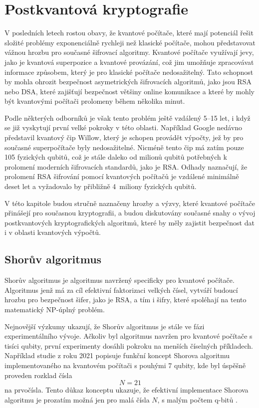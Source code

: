 \section{Postkvantová kryptografie}
\label{sec:postkvantova-kryptografie}
V posledních letech rostou obavy, že kvantové počítače, které mají potenciál řešit složité problémy exponenciálně rychleji než klasické počítače, mohou představovat vážnou hrozbu pro současné šifrovací algoritmy. Kvantové počítače využívají jevy, jako je kvantová superpozice a kvantové provázání, což jim umožňuje zpracovávat informace způsobem, který je pro klasické počítače nedosažitelný. Tato schopnost by mohla ohrozit bezpečnost asymetrických šifrovacích algoritmů, jako jsou RSA nebo DSA, které zajišťují bezpečnost většiny online komunikace a které by mohly být kvantovými počítači prolomeny během několika minut\mbox{\parencite{qubits2024}.}

Podle některých odborníků je však tento problém ještě vzdálený 5--15 let, i když se již vyskytují první velké pokroky v této oblasti. Například Google nedávno představil kvantový čip Willow, který je schopen provádět výpočty, jež by pro současné superpočítače byly nedosažitelné. Nicméně tento čip má zatím pouze 105 fyzických qubitů, což je stále daleko od milionů qubitů potřebných k prolomení moderních šifrovacích standardů, jako je RSA. Odhady naznačují, že prolomení RSA šifrování pomocí kvantových počítačů je vzdálené minimálně deset let a vyžadovalo by přibližně 4~miliony fyzických qubitů\parencite{qubits2024}.

V této kapitole budou stručně naznačeny hrozby a výzvy, které kvantové počítače přinášejí pro současnou kryptografii, a budou diskutovány současné snahy o vývoj postkvantových kryptografických algoritmů, které by měly zajistit bezpečnost dat i v oblasti kvantových výpočtů.

\subsection{Shorův algoritmus}
Shorův algoritmus je algoritmus navržený specificky pro kvantové počítače. Algoritmus jenž má za cíl efektivní faktorizaci velkých čísel, vytváří budoucí hrozbu pro bezpečnost šifer, jako je RSA, a tím i šifry, které spoléhají na tento matematický NP-úplný problém.

Nejnovější výzkumy ukazují, že Shorův algoritmus je stále ve fázi experimentálního vývoje. Ačkoliv byl algoritmus navržen pro kvantové počítače s tisíci qubity, první experimenty dosáhli pokroku na menších číselných příkladech. Například studie z roku 2021 popisuje funkční koncept Shorova algoritmu implementovaného na kvantovém počítači s pouhými 7 qubity, kde byl úspěšně proveden rozklad čísla \[N = 21\] na prvočísla. Tento důkaz konceptu ukazuje, že efektivní implementace \mbox{Shorova} algoritmu je prozatím možná jen pro malá čísla \(N\), s malým počtem q-bitů \mbox{\parencite{skosana2021}.}

